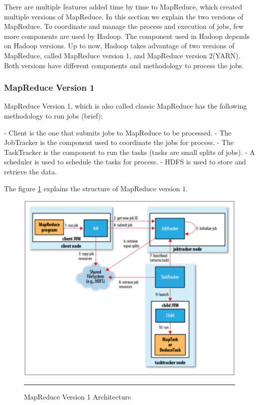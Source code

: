 There are multiple features added time by time to MapReduce, which created multiple versions of MapReduce. In this section we explain the two versions of MapReduce. To coordinate and manage the process and execution of jobs, few more components are used by Hadoop. The component used in Hadoop depends on Hadoop versions. Up to now, Hadoop takes advantage of two versions of MapReduce, called MapReduce version 1, and MapReduce version 2(YARN). Both versions have different components and methodology to process the jobs. 

\subsubsection{MapReduce Version 1} 
MapReduce Version 1, which is also called classic MapReduce has the following methodology to run jobs (brief):

  - Client is the one that submits jobs to MapReduce to be processed. 
  - The JobTracker is the component used to coordinate the jobs for process. 
  - The TaskTracker is the component to run the tasks (tasks are small splits of jobs).
  - A scheduler is used to schedule the tasks for process.
  - HDFS‌ is used to store and retrieve the data.  
 
The figure \ref{mrv1}  explains the structure of MapReduce version 1. 

\begin{figure}[htbp]
  \centering
    \includegraphics[width=10 cm,height=10 cm]{./Figures/mrv1.pdf}
    \rule{28em}{0.5pt}
  \caption{MapReduce Version 1 Architecture \cite{tom3}}
  \label{mrv1}
\end{figure}
 


